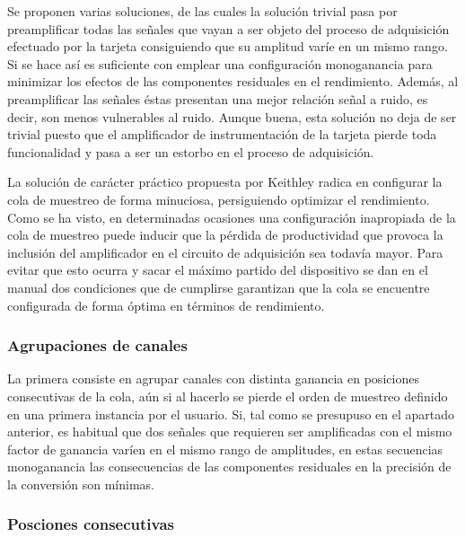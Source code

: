 Se proponen varias soluciones, de las cuales la solución trivial pasa por
preamplificar todas las señales que vayan a ser objeto del proceso de
adquisición efectuado por la tarjeta consiguiendo que su amplitud varíe en
un mismo rango. Si se hace así es suficiente con emplear una configuración
monoganancia para minimizar los efectos de las componentes residuales en el
rendimiento. Además, al preamplificar las señales éstas presentan una mejor
relación señal a ruido, es decir, son menos vulnerables al ruido. Aunque
buena, esta solución no deja de ser trivial puesto que el amplificador de
instrumentación de la tarjeta pierde toda funcionalidad y pasa a ser un
estorbo en el proceso de adquisición.

La solución de carácter práctico propuesta por Keithley radica en
configurar la cola de muestreo de forma minuciosa, persiguiendo optimizar
el rendimiento. Como se ha visto, en determinadas ocasiones una
configuración inapropiada de la cola de muestreo puede inducir que la
pérdida de productividad que provoca la inclusión del amplificador en el
circuito de adquisición sea todavía mayor. Para evitar que esto ocurra y
sacar el máximo partido del dispositivo se dan en el manual dos condiciones
que de cumplirse garantizan que la cola se encuentre configurada de forma
óptima en términos de rendimiento.


\subsubsection{Agrupaciones de canales}

La primera consiste en agrupar canales con distinta ganancia en posiciones
consecutivas de la cola, aún si al hacerlo se pierde el orden de muestreo
definido en una primera instancia por el usuario. Si, tal como se presupuso
en el apartado anterior, es habitual que dos señales que requieren ser
amplificadas con el mismo factor de ganancia varíen en el mismo rango de
amplitudes, en estas secuencias monoganancia las consecuencias de las
componentes residuales en la precisión de la conversión son mínimas.


\subsubsection{Posciones consecutivas}

